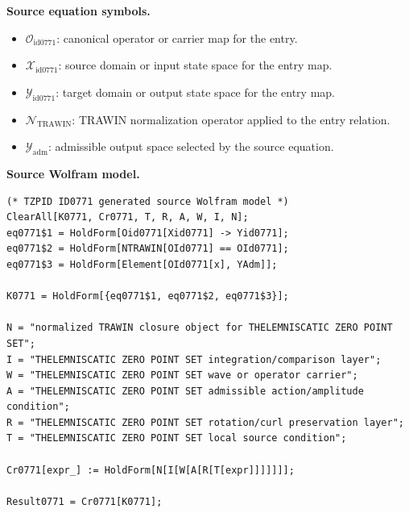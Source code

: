 \begin{minipage}[t]{0.49\linewidth}
\begingroup
\small
\raggedright
\textbf{Source equation symbols.}\par
\begin{itemize}[leftmargin=1.35em,itemsep=1pt,topsep=1pt,parsep=0pt]
    \item $\mathcal{O}_{\mathrm{id0771}}$: canonical operator or carrier map for the entry.
    \item $\mathcal{X}_{\mathrm{id0771}}$: source domain or input state space for the entry map.
    \item $\mathcal{Y}_{\mathrm{id0771}}$: target domain or output state space for the entry map.
    \item $\mathcal{N}_{\mathrm{TRAWIN}}$: TRAWIN normalization operator applied to the entry relation.
    \item $\mathcal{Y}_{\mathrm{adm}}$: admissible output space selected by the source equation.
\end{itemize}
\endgroup
\end{minipage}\hfill
\begin{minipage}[t]{0.47\linewidth}
\begingroup
\scriptsize
\raggedright
\textbf{Source Wolfram model.}\par
\begin{Verbatim}[fontsize=\tiny,breaklines=true,breakanywhere=true]
(* TZPID ID0771 generated source Wolfram model *)
ClearAll[K0771, Cr0771, T, R, A, W, I, N];
eq0771$1 = HoldForm[Oid0771[Xid0771] -> Yid0771];
eq0771$2 = HoldForm[NTRAWIN[OId0771] == OId0771];
eq0771$3 = HoldForm[Element[OId0771[x], YAdm]];

K0771 = HoldForm[{eq0771$1, eq0771$2, eq0771$3}];

N = "normalized TRAWIN closure object for THELEMNISCATIC ZERO POINT SET";
I = "THELEMNISCATIC ZERO POINT SET integration/comparison layer";
W = "THELEMNISCATIC ZERO POINT SET wave or operator carrier";
A = "THELEMNISCATIC ZERO POINT SET admissible action/amplitude condition";
R = "THELEMNISCATIC ZERO POINT SET rotation/curl preservation layer";
T = "THELEMNISCATIC ZERO POINT SET local source condition";

Cr0771[expr_] := HoldForm[N[I[W[A[R[T[expr]]]]]]];

Result0771 = Cr0771[K0771];
\end{Verbatim}
\endgroup
\end{minipage}

